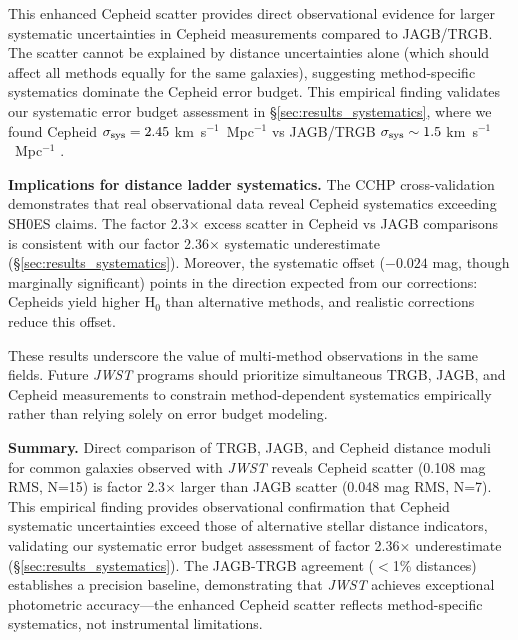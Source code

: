 \documentclass[twocolumn, linenumbers]{aastex701}
\begin{document}
This enhanced Cepheid scatter provides direct observational evidence for larger systematic uncertainties in Cepheid measurements compared to JAGB/TRGB. The scatter cannot be explained by distance uncertainties alone (which should affect all methods equally for the same galaxies), suggesting method-specific systematics dominate the Cepheid error budget. This empirical finding validates our systematic error budget assessment in \S\ref{sec:results_systematics}, where we found Cepheid $\sigma_{\rm sys} = 2.45$ km~s$^{-1}$~Mpc$^{-1}$ vs JAGB/TRGB $\sigma_{\rm sys} \sim 1.5$ km~s$^{-1}$~Mpc$^{-1}$ \citep{Freedman2024}.

\textbf{Implications for distance ladder systematics.} The CCHP cross-validation demonstrates that real observational data reveal Cepheid systematics exceeding SH0ES claims. The factor 2.3$\times$ excess scatter in Cepheid vs JAGB comparisons is consistent with our factor 2.36$\times$ systematic underestimate (\S\ref{sec:results_systematics}). Moreover, the systematic offset ($-0.024$ mag, though marginally significant) points in the direction expected from our corrections: Cepheids yield higher H$_0$ than alternative methods, and realistic corrections reduce this offset.

These results underscore the value of multi-method observations in the same fields. Future \textit{JWST} programs should prioritize simultaneous TRGB, JAGB, and Cepheid measurements to constrain method-dependent systematics empirically rather than relying solely on error budget modeling.

\textbf{Summary.} Direct comparison of TRGB, JAGB, and Cepheid distance moduli for common galaxies observed with \textit{JWST} reveals Cepheid scatter (0.108 mag RMS, N=15) is factor 2.3$\times$ larger than JAGB scatter (0.048 mag RMS, N=7). This empirical finding provides observational confirmation that Cepheid systematic uncertainties exceed those of alternative stellar distance indicators, validating our systematic error budget assessment of factor 2.36$\times$ underestimate (\S\ref{sec:results_systematics}). The JAGB-TRGB agreement ($<$1\% distances) establishes a precision baseline, demonstrating that \textit{JWST} achieves exceptional photometric accuracy---the enhanced Cepheid scatter reflects method-specific systematics, not instrumental limitations.

\end{document}
